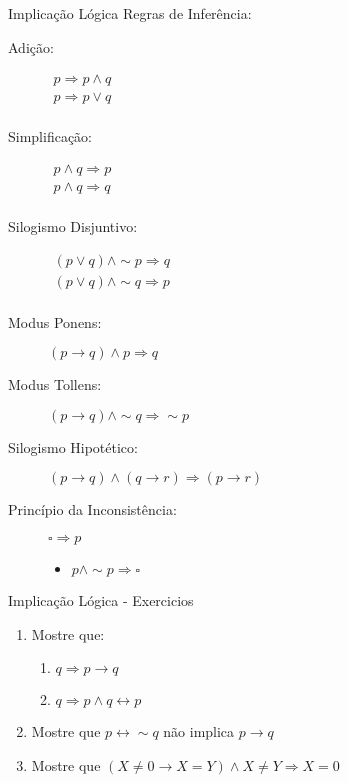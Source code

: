 \begin{frame}[t]{Implicação Lógica} %
	Regras de Inferência:
	\begin{description}
	\item[Adição:] 
		$\begin{array}{l}
		   p \Rightarrow p \wedge q \\ 
		   p \Rightarrow p \vee q \\
		\end{array}$

	\item[Simplificação:] 
		$\begin{array}{l}
		  p \wedge q \Rightarrow p \\
		  p \wedge q \Rightarrow q \\
		\end{array}$

	\item[Silogismo Disjuntivo:] 
		$\begin{array}{l}
		  (p \vee q) \wedge \sim p \Rightarrow q \\
		  (p \vee q) \wedge \sim q \Rightarrow p \\
		\end{array}$

	\item[Modus Ponens:] $ (p \rightarrow q) \wedge p \Rightarrow q$

	\item[Modus Tollens:] $ (p \rightarrow q) \wedge \sim q \Rightarrow \sim p$

	\item[Silogismo Hipotético:] $ (p \rightarrow q) \wedge  (q \rightarrow r) \Rightarrow  (p \rightarrow r)$

	\item[Princípio da Inconsistência:] $ \square \Rightarrow  p$
		\begin{itemize} 
		\item $p \wedge \sim p \Rightarrow \square $ 
		\end{itemize}

	\end{description}
\end{frame}

\begin{frame}[t]{Implicação Lógica - Exercicios} %
	\begin{enumerate}
	\item Mostre que:
	   \begin{enumerate}
	   \item $q \Rightarrow p \rightarrow q$
	   \item $q \Rightarrow p \wedge q \leftrightarrow p$
	   \end{enumerate}

	\item Mostre que $p \leftrightarrow\sim q$ não implica $p \rightarrow q$

	\item Mostre que $(X \neq 0 \rightarrow X=Y) \wedge X \neq Y \Rightarrow X=0$
	\end{enumerate}
\end{frame}
